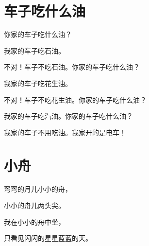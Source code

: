 \documentclass[12pt,UTF-8,openany]{ctexbook}
\begin{document}
\hanzibox{}\hanzibox{}\hanzibox{}\hanzibox{}\hspace{1em}\hanzibox{}\hanzibox{}\hanzibox{}\hanzibox{}






\chapter{车子吃什么油}

\begin{large}
    
    你家的车子吃什么油？
    
    我家的车子吃石油。
    
    不对！车子不吃石油。你家的车子吃什么油？
    
    我家的车子吃花生油。
    
    不对！车子不吃花生油。你家的车子吃什么油？
    
    我家的车子吃汽油。你家的车子吃什么油？
    
    我家的车子不用吃油。我家开的是电车！
    
\end{large}


\clearpage

\begin{center}
    
\end{center}


\hanzibox{}\hanzibox{}\hanzibox{}\hanzibox{}\hspace{1em}\hanzibox{}\hanzibox{}\hanzibox{}\hanzibox{}

\hanzibox{}\hanzibox{}\hanzibox{}\hanzibox{}\hspace{1em}\hanzibox{}\hanzibox{}\hanzibox{}\hanzibox{}

\hanzibox{}\hanzibox{}\hanzibox{}\hanzibox{}\hspace{1em}




\chapter{小舟}

\begin{large}
    
    弯弯的月儿小小的舟，
    
    小小的舟儿两头尖。
    
    我在小小的舟中坐，
    
    只看见闪闪的星星蓝蓝的天。
    
\end{large}
\end{document}

